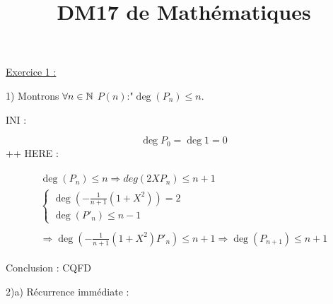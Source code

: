\documentclass{article}
\title{DM17 de Mathématiques}
\begin{document}
\maketitle

\underline{Exercice 1 :}

1) Montrons $\forall n\in\mathbb{N}$ $P(n)$:"$\deg(P_n)\leq n$.

INI :

$$\deg{P_0}=\deg{1}=0$$
++
HERE :

\begin{align*}\begin{split}
\deg(P_n)\leq n\Longrightarrow deg(2XP_n)\leq n+1\\
\begin{cases}
    \deg(-\frac{1}{n+1}(1+X^2))=2\\
    \deg(P'_n)\leq n-1
\end{cases}\\\\
\Longrightarrow \deg(-\frac{1}{n+1}(1+X^2)P'_n)\leq n+1
\Longrightarrow \deg(P_{n+1})\leq n+1
\end{split}\end{align*}

Conclusion : CQFD

\bigskip
\bigskip
\bigskip

2)a) Récurrence immédiate :
\end{document}
